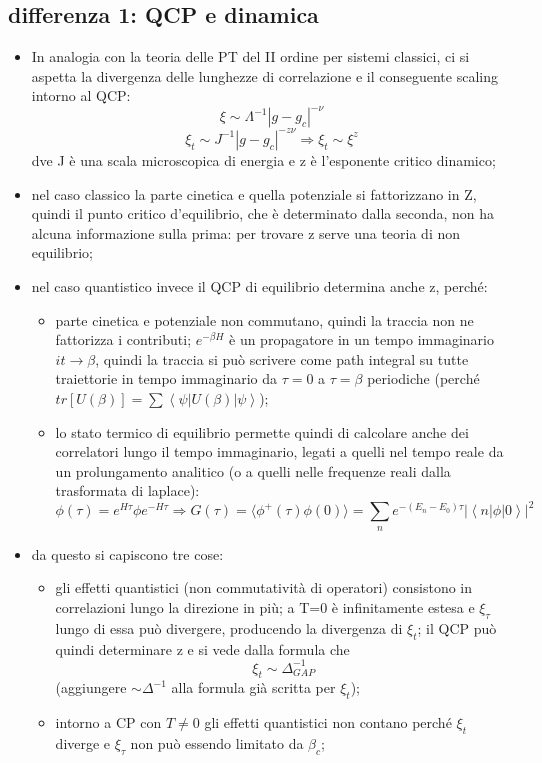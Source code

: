 \documentclass[a4paper,11pt]{article}
\newcommand{\mean}[1]{\ensuremath{\langle #1 \rangle}}
\newcommand{\ket}[1]{\left | #1 \right \rangle}
\newcommand{\bra}[1]{\left \langle  #1 \right |}
\newcommand{\csi}{\xi}
\newcommand{\ssubsection}[1]{\vspace{0.2cm} \subsection{#1}}
\begin{document}
\ssubsection{differenza 1: QCP e dinamica}

\begin{itemize}
 \item In analogia con la teoria delle PT del II ordine per sistemi classici, ci si aspetta la divergenza delle lunghezze di correlazione e il conseguente scaling intorno al QCP: 
	\[ \csi \sim \Lambda^{-1} |g-g_c|^{-\nu}\]
	\[\csi_t \sim J^{-1} |g-g_c|^{-z\nu} \Rightarrow \csi_t \sim \csi^z\] dve J è una scala microscopica di energia e z è l'esponente critico dinamico;
 \item nel caso classico la parte cinetica e quella potenziale si fattorizzano in Z, quindi il punto critico d'equilibrio, che è determinato dalla seconda, non ha alcuna informazione sulla prima: per trovare z serve una teoria di non equilibrio;
 \item nel caso quantistico invece il QCP di equilibrio determina anche z, perché:
 		\begin{itemize}
 		 \item parte cinetica e potenziale non commutano, quindi la traccia non ne fattorizza i contributi; $e^{-\beta H}$ è un propagatore in un tempo immaginario $it \to \beta$, quindi la traccia si può scrivere come path integral su tutte traiettorie in tempo immaginario da $\tau=0$ a $\tau=\beta$ periodiche (perché $tr[U(\beta)] = \sum \bra{\psi}U(\beta)\ket{\psi}$);
 		 \item lo stato termico di equilibrio permette quindi di calcolare anche dei correlatori lungo il tempo immaginario, legati a quelli nel tempo reale da un prolungamento analitico (o a quelli nelle frequenze reali dalla trasformata di laplace): 
 		 \[\phi(\tau) = e^{H\tau}\phi e^{-H\tau} \Rightarrow G(\tau) = \mean{\phi^+(\tau)\phi(0)} = \sum_{n} e^{-(E_n-E_0)\tau} \left|\bra{n}\phi\ket{0}\right|^2\] 
 		\end{itemize}
 \item da questo si capiscono tre cose:
		\begin{itemize}
		 \item gli effetti quantistici (non commutatività di operatori) consistono in correlazioni lungo la direzione in più; a T=0 è infinitamente estesa e $\csi_{\tau}$ lungo di essa può divergere, producendo la divergenza di $\csi_t$; il QCP può quindi determinare z e si vede dalla formula che \[\csi_t \sim \Delta_{GAP}^{-1}\] (aggiungere $\sim \Delta^{-1}$ alla formula già scritta per $\csi_t$);
		 \item intorno a CP con $T\neq 0$ gli effetti quantistici non contano perché $\csi_t$ diverge e $\csi_{\tau}$ non può essendo limitato da $\beta_c$;

\end{itemize}
\end{itemize}
\end{document}
